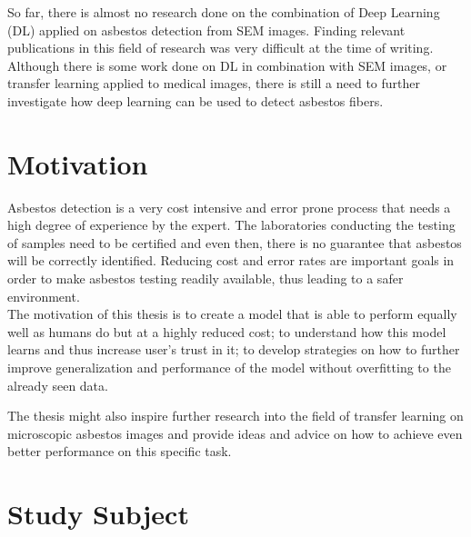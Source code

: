 So far, there is almost no research done on the combination of Deep Learning (DL) applied on asbestos detection from SEM images. Finding relevant publications in this field of research was very difficult at the time of writing. Although there is some work done on DL in combination with SEM images, or transfer learning applied to medical images, there is still a need to further investigate how deep learning can be used to detect asbestos fibers.\\



\section{Motivation}

Asbestos detection is a very cost intensive and error prone process that needs a high degree of experience by the expert. The laboratories conducting the testing of samples need to be certified and even then, there is no guarantee that asbestos will be correctly identified. Reducing cost and error rates are important goals in order to make asbestos testing readily available, thus leading to a safer environment.\\

The motivation of this thesis is to create a model that is able to perform equally well as humans do but at a highly reduced cost; to understand how this model learns and thus increase user's trust in it; to develop strategies on how to further improve generalization and performance of the model without overfitting to the already seen data. \\

\newpage

The thesis might also inspire further research into the field of transfer learning on microscopic asbestos images and provide ideas and advice on how to achieve even better performance on this specific task.\\


\section{Study Subject}


